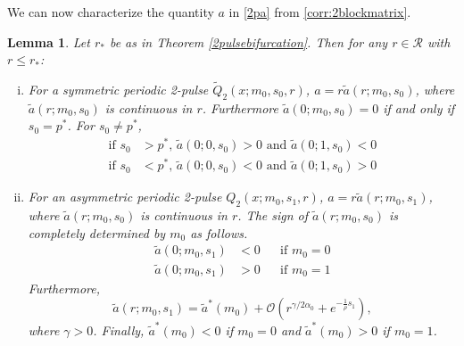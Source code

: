 \documentclass[11pt,reqno]{amsart}
\theoremstyle{plain}
\newtheorem{lemma}[theorem]{Lemma}
\theoremstyle{definition}
\theoremstyle{remark}
\newtheorem{remark}[theorem]{Remark}
\begin{document}


We can now characterize the quantity $a$ in \cref{2pa} from \cref{corr:2blockmatrix}.

\begin{lemma}\label{lemma:chara}
Let $r_*$ be as in Theorem \ref{2pulsebifurcation}. Then for any $r \in \mathcal{R}$ with $r \leq r_*$:
\begin{enumerate}[(i)]
	\item For a symmetric periodic 2-pulse $\tilde{Q}_2(x; m_0, s_0, r)$, $a = r \tilde{a}(r; m_0, s_0)$, where $\tilde{a}(r; m_0, s_0)$ is continuous in $r$. Furthermore $\tilde{a}(0; m_0, s_0) = 0$ if and only if $s_0 = p^*$. For $s_0 \neq p^*$,
	\begin{equation}
	\begin{aligned}
	\text{if }s_0 &> p^*, \, \tilde{a}(0; 0, s_0) > 0 \text{ and } \tilde{a}(0; 1, s_0) < 0 \\
	\text{if }s_0 &< p^*, \, \tilde{a}(0; 0, s_0) < 0 \text{ and } \tilde{a}(0; 1, s_0) > 0 
	\end{aligned}
	\end{equation}

	\item For an asymmetric periodic 2-pulse $Q_2(x; m_0, s_1, r)$, $a = r \tilde{a}(r; m_0, s_1)$, where $\tilde{a}(r; m_0, s_0)$ is continuous in $r$. The sign of $\tilde{a}(r; m_0, s_0)$ is completely determined by $m_0$ as follows.
	\begin{equation} 
	\begin{aligned}
	\tilde{a}(0; m_0, s_1) &< 0 && \text{if }m_0 = 0 \\
	\tilde{a}(0; m_0, s_1) &> 0 && \text{if }m_0 = 1
	\end{aligned}
	\end{equation}
	Furthermore,
	\begin{equation}\label{tildeas1limit}
	\tilde{a}(r; m_0, s_1) = \tilde{a}^*(m_0) + \mathcal{O}\left(r^{\gamma/2\alpha_0} + e^{-\frac{1}{\rho}s_1} \right),
	\end{equation}
	where $\gamma > 0$. Finally, $\tilde{a}^*(m_0) < 0$ if $m_0 = 0$ and $\tilde{a}^*(m_0) > 0$ if $m_0 = 1$.
\end{enumerate}	
\end{lemma}
\end{document}
